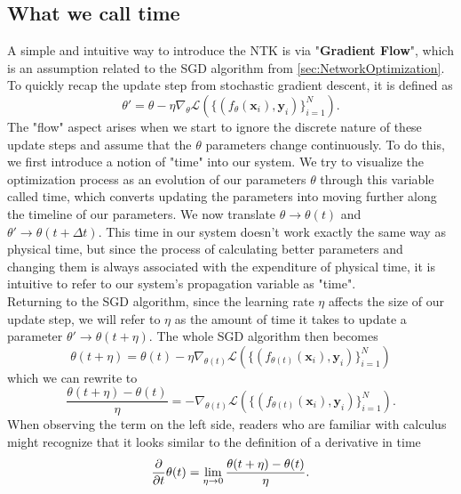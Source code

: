 \subsection{What we call time}
A simple and intuitive way to introduce the NTK is via "\textbf{Gradient Flow}", which is an assumption related to the SGD algorithm from \cref{sec:NetworkOptimization}. To quickly recap the update step from stochastic gradient descent, it is defined as 
\begin{equation}
	\theta' = \theta - \eta \nabla_\theta \mathscr{L}\left( \{(f_\theta(\mathbf{x}_i), \mathbf{y}_i)\}_{i=1}^{N} \right).
\end{equation}
The "flow" aspect arises when we start to ignore the discrete nature of these update steps and assume that the $\theta$ parameters change continuously. To do this, we first introduce a notion of "time" into our system. We try to visualize the optimization process as an evolution of our parameters $\theta$ through this variable called time, which converts updating the parameters into moving further along the timeline of our parameters. We now translate $\theta \rightarrow \theta(t)$ and $\theta' \rightarrow \theta(t+\Delta t)$. This time in our system doesn't work exactly the same way as physical time, but since the process of calculating better parameters and changing them is always associated with the expenditure of physical time, it is intuitive to refer to our system's propagation variable as "time". \\
Returning to the SGD algorithm, since the learning rate $\eta$ affects the size of our update step, we will refer to $\eta$ as the amount of time it takes to update a parameter $\theta' \rightarrow \theta(t+\eta)$. The whole SGD algorithm then becomes
\begin{equation}
	\theta(t+\eta) = \theta(t) - \eta \nabla_{\theta(t)} \mathscr{L}\left( \{(f_{\theta(t)}(\mathbf{x}_i), \mathbf{y}_i)\}_{i=1}^{N} \right)
\end{equation}
which we can rewrite to 
\begin{equation}
	\frac{\theta(t+\eta)-\theta(t)}{\eta} = - \nabla_{\theta(t)} \mathscr{L}\left( \{(f_{\theta(t)}(\mathbf{x}_i), \mathbf{y}_i)\}_{i=1}^{N} \right).
\end{equation}
When observing the term on the left side, readers who are familiar with calculus might recognize that it looks similar to the definition of a derivative in time
\begin{equation}
	\frac{\partial}{\partial t}\theta(t) = \lim_{\eta\rightarrow0} \frac{\theta(t+\eta)-\theta(t)}{\eta}.
\end{equation}
